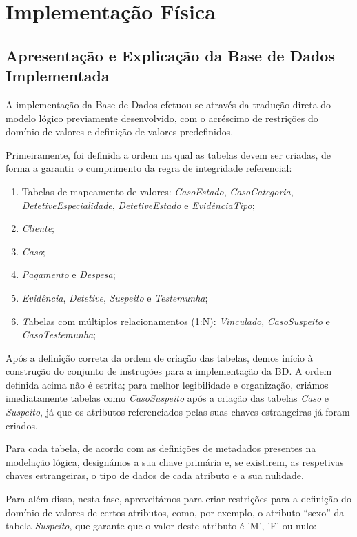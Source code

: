 \documentclass[a4paper,12pt]{scrreprt}
\begin{document}
\chapter{Implementação Física}
\section{Apresentação e Explicação da Base de Dados Implementada}
\label{chap:impBD}
A implementação da Base de Dados efetuou-se através da tradução direta do modelo lógico previamente desenvolvido, com o acréscimo de restrições do domínio de valores e definição de valores predefinidos.

Primeiramente, foi definida a ordem na qual as tabelas devem ser criadas, de forma a garantir o cumprimento da regra de integridade referencial:

\begin{enumerate}
    \item Tabelas de mapeamento de valores: \textit{CasoEstado}, \textit{CasoCategoria}, \textit{DetetiveEspecialidade}, \textit{DetetiveEstado} e \textit{EvidênciaTipo};
    \item \textit{Cliente};
    \item \textit{Caso};
    \item \textit{Pagamento} e \textit{Despesa};
    \item \textit{Evidência}, \textit{Detetive}, \textit{Suspeito} e \textit{Testemunha};
    \item \textit Tabelas com múltiplos relacionamentos (1:N): \textit{Vinculado}, \textit{CasoSuspeito} e \textit{CasoTestemunha};
\end{enumerate}

Após a definição correta da ordem de criação das tabelas, demos início à construção do conjunto de instruções para a implementação da BD. A ordem definida acima não é estrita; para melhor legibilidade e organização, criámos imediatamente tabelas como \textit{CasoSuspeito} após a criação das tabelas \textit{Caso} e \textit{Suspeito}, já que os atributos referenciados pelas suas chaves estrangeiras já foram criados.

Para cada tabela, de acordo com as definições de metadados presentes na modelação lógica, designámos a sua chave primária e, se existirem, as respetivas chaves estrangeiras, o tipo de dados de cada atributo e a sua nulidade.

\clearpage

Para além disso, nesta fase, aproveitámos para criar restrições para a definição do domínio de valores de certos atributos, como, por exemplo, o atributo “sexo” da tabela \textit{Suspeito}, que garante que o valor deste atributo é 'M', 'F' ou nulo:
\end{document}
